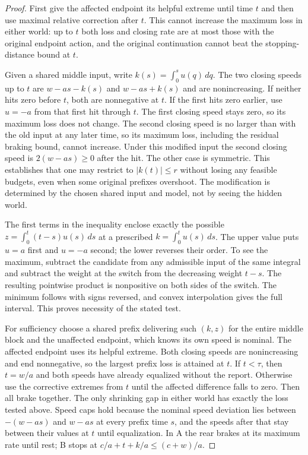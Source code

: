 \documentclass[11pt]{article}
\begin{document}
\begin{proof}
First give the affected endpoint its helpful extreme until time $t$ and then use maximal relative correction after $t$. This cannot increase the maximum loss in either world: up to $t$ both loss and closing rate are at most those with the original endpoint action, and the original continuation cannot beat the stopping-distance bound at $t$.

Given a shared middle input, write $k(s)=\int_0^s u(q)\,dq$. The two closing speeds up to $t$ are $w-as-k(s)$ and $w-as+k(s)$ and are nonincreasing. If neither hits zero before $t$, both are nonnegative at $t$. If the first hits zero earlier, use $u=-a$ from that first hit through $t$. The first closing speed stays zero, so its maximum loss does not change. The second closing speed is no larger than with the old input at any later time, so its maximum loss, including the residual braking bound, cannot increase. Under this modified input the second closing speed is $2(w-as)\ge0$ after the hit. The other case is symmetric. This establishes that one may restrict to $|k(t)|\le r$ without losing any feasible budgets, even when some original prefixes overshoot. The modification is determined by the chosen shared input and model, not by seeing the hidden world.

The first terms in the inequality enclose exactly the possible $z=\int_0^t(t-s)u(s)\,ds$ at a prescribed $k=\int_0^t u(s)\,ds$. The upper value puts $u=a$ first and $u=-a$ second; the lower reverses their order. To see the maximum, subtract the candidate from any admissible input of the same integral and subtract the weight at the switch from the decreasing weight $t-s$. The resulting pointwise product is nonpositive on both sides of the switch. The minimum follows with signs reversed, and convex interpolation gives the full interval. This proves necessity of the stated test.

For sufficiency choose a shared prefix delivering such $(k,z)$ for the entire middle block and the unaffected endpoint, which knows its own speed is nominal. The affected endpoint uses its helpful extreme. Both closing speeds are nonincreasing and end nonnegative, so the largest prefix loss is attained at $t$. If $t<\tau$, then $t=w/a$ and both speeds have already equalized without the report. Otherwise use the corrective extremes from $t$ until the affected difference falls to zero. Then all brake together. The only shrinking gap in either world has exactly the loss tested above. Speed caps hold because the nominal speed deviation lies between $-(w-as)$ and $w-as$ at every prefix time $s$, and the speeds after that stay between their values at $t$ until equalization. In A the rear brakes at its maximum rate until rest; B stops at $c/a+t+k/a\le(c+w)/a$.
\end{proof}
\end{document}
